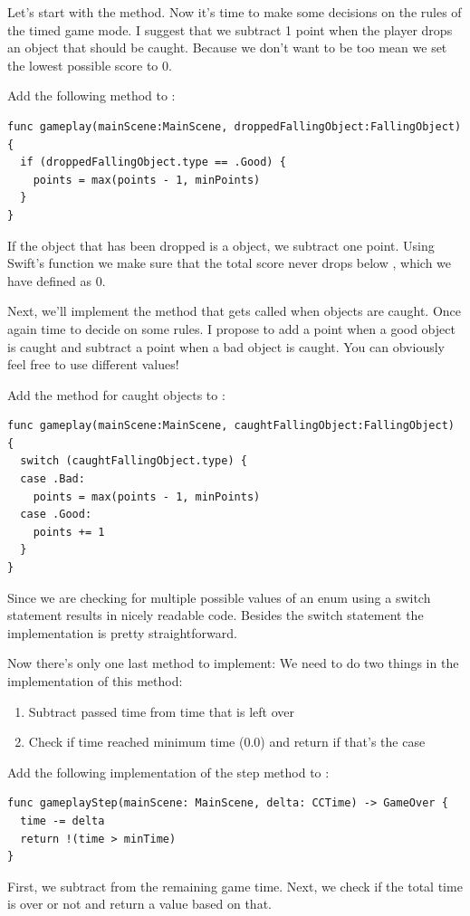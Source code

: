 Let's start with the  method. Now it's time to make some decisions on the
rules of the timed game mode. I suggest that we subtract 1 point when the player
drops an object that should be caught. Because we don't want to be too mean we
set the lowest possible score to 0.

\begin{leftbar}
Add the following method to :
\begin{lstlisting}
func gameplay(mainScene:MainScene, droppedFallingObject:FallingObject) {
  if (droppedFallingObject.type == .Good) {
    points = max(points - 1, minPoints)
  }
}
\end{lstlisting}
\end{leftbar}
If the object that has been dropped is a  object, we subtract
one point. Using Swift's  function we make sure that the total
score never drops below , which we have defined as 0.

Next, we'll implement the method that gets called when objects are caught.
Once again time to decide on some rules. I propose to add a point when a good
object is caught and subtract a point when a bad object is caught. You can
obviously feel free to use different values!

\begin{leftbar}
Add the method for caught objects to :
\begin{lstlisting}
func gameplay(mainScene:MainScene, caughtFallingObject:FallingObject) {
  switch (caughtFallingObject.type) {
  case .Bad:
    points = max(points - 1, minPoints)
  case .Good:
    points += 1
  }
}
\end{lstlisting}
\end{leftbar}
Since we are checking for multiple possible values of an enum using a switch
statement results in nicely readable code. Besides the switch statement the
implementation is pretty straightforward.

Now there's only one last method to implement:
 We need to do two things in the
implementation of this method:
\begin{enumerate}
  \item Subtract passed time from time that is left over
  \item Check if time reached minimum time (0.0) and return  if
  that's the case
\end{enumerate}
\begin{leftbar}
Add the following implementation of the step method to
:
\begin{lstlisting}
func gameplayStep(mainScene: MainScene, delta: CCTime) -> GameOver {
  time -= delta
  return !(time > minTime)
}
\end{lstlisting}
\end{leftbar}
First, we subtract  from the remaining game time. Next, we
check if the total time is over or not and return a  value
based on that.

